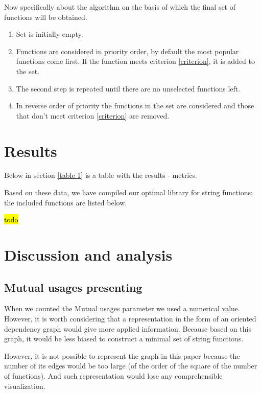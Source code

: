 \documentclass[anonymous,sigplan,review,11pt,nonacm,natbib=false]{acmart}
\begin{document}
    Now specifically about the algorithm on the basis of which the final set of functions will be obtained.

    \begin{enumerate}
        \item Set is initially empty.
        \item Functions are considered in priority order, by default the most popular functions come first. If the function meets criterion \ref{criterion}, it is added to the set.
        \item The second step is repeated until there are no unselected functions left.
        \item In reverse order of priority the functions in the set are considered and those that don't meet criterion \ref{criterion} are removed.
    \end{enumerate}

    \section{Results}

    Below in section \ref{table 1} is a table with the results - metrics.

    Based on these data, we have compiled our optimal library for string functions; the included functions are listed below.

    \hl{todo}

    \section{Discussion and analysis}

    \subsection{Mutual usages presenting}

    When we counted the Mutual usages parameter we used a numerical value. However, it is worth considering that a representation in the form of an oriented dependency graph would give more applied information. Because based on this graph, it would be less biased to construct a minimal set of string functions.

    However, it is not possible to represent the graph in this paper because the number of its edges would be too large (of the order of the square of the number of functions). And such representation would lose any comprehensible visualization.
\end{document}
